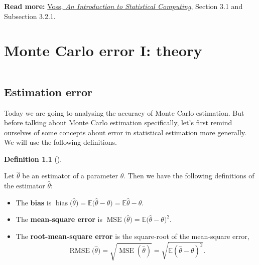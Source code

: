 \documentclass[
  letterpaper,
  DIV=11,
  numbers=noendperiod]{scrreprt}
\theoremstyle{plain}
\theoremstyle{definition}
\newtheorem{definition}{Definition}[chapter]
\theoremstyle{definition}
\theoremstyle{remark}
\begin{document}
\textbf{Read more:}
\href{https://leeds.primo.exlibrisgroup.com/permalink/44LEE_INST/1fj430b/cdi_askewsholts_vlebooks_9781118728031}{Voss,
\emph{An Introduction to Statistical Computing}}, Section 3.1 and
Subsection 3.2.1.

\chapter{Monte Carlo error I: theory}\label{monte-carlo-error-i-theory}

\[\newcommand{\Exg}{\operatorname{\mathbb{E}}} 
\newcommand{\Ex}{\mathbb{E}} 
\newcommand{\Ind}{\mathbb{I}}
\newcommand{\Var}{\operatorname{Var}}
\newcommand{\Cov}{\operatorname{Cov}}
\newcommand{\Corr}{\operatorname{Corr}}
\newcommand{\ee}{\mathrm{e}}\]

\section{Estimation error}\label{estimation-error}

Today we are going to analysing the accuracy of Monte Carlo estimation.
But before talking about Monte Carlo estimation specifically, let's
first remind ourselves of some concepts about error in statistical
estimation more generally. We will use the following definitions.

\begin{definition}[]\protect\hypertarget{def-stats}{}\label{def-stats}

Let \(\widehat\theta\) be an estimator of a parameter \(\theta\). Then
we have the following definitions of the estimator \(\widehat\theta\):

\begin{itemize}
\item
  The \textbf{bias} is
  \(\operatorname{bias}\big(\widehat\theta\big) = \mathbb E\big(\widehat\theta - \theta\big)  = \mathbb E\widehat\theta - \theta\).
\item
  The \textbf{mean-square error} is
  \(\operatorname{MSE}\big(\widehat\theta\big) = \mathbb E \big(\widehat\theta - \theta\big)^2\).
\item
  The \textbf{root-mean-square error} is the square-root of the
  mean-square error,
  \[\operatorname{RMSE}\big(\widehat\theta\big) = \sqrt{\operatorname{MSE}(\widehat\theta)} = \sqrt{\mathbb E (\widehat\theta - \theta)^2} . \]
\end{itemize}

\end{definition}
\end{document}
